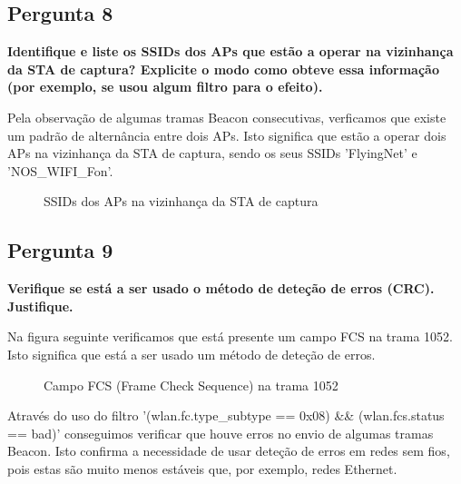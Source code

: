 \documentclass[11pt]{article}
\begin{document}
\subsection{Pergunta 8}

\textbf{Identifique e liste os SSIDs dos APs que estão a operar na vizinhança da STA de captura? Explicite o modo como obteve essa informação (por exemplo, se usou algum filtro para o efeito).}

Pela observação de algumas tramas Beacon consecutivas, verficamos que existe um padrão de alternância entre dois APs. Isto significa que estão a operar dois APs na vizinhança da STA de captura, sendo os seus SSIDs 'FlyingNet' e 'NOS\_WIFI\_Fon'.

\begin{figure}[hbt!]
    \centering
    \caption{SSIDs dos APs na vizinhança da STA de captura}
\end{figure}

\subsection{Pergunta 9}

\textbf{Verifique se está a ser usado o método de deteção de erros (CRC). Justifique.}

Na figura seguinte verificamos que está presente um campo FCS na trama 1052. Isto significa que está a ser usado um método de deteção de erros.

\begin{figure}[hbt!]
    \centering
    \caption{Campo FCS (Frame Check Sequence) na trama 1052}
\end{figure}

Através do uso do filtro '(wlan.fc.type\_subtype == 0x08) && (wlan.fcs.status == bad)' conseguimos verificar que houve erros no envio de algumas tramas Beacon. Isto confirma a necessidade de usar deteção de erros em redes sem fios, pois estas são muito menos estáveis que, por exemplo, redes Ethernet.
\end{document}
